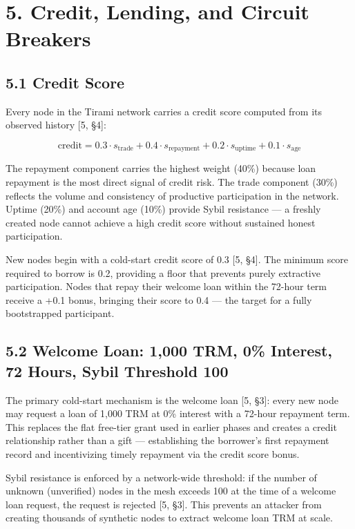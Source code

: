 \documentclass[
  11pt,
]{article}
\begin{document}
\section{5. Credit, Lending, and Circuit
Breakers}\label{credit-lending-and-circuit-breakers}

\subsection{5.1 Credit Score}\label{credit-score}

Every node in the Tirami network carries a credit score computed from
its observed history {[}5, §4{]}:

\[\text{credit} = 0.3 \cdot s_{\text{trade}} + 0.4 \cdot s_{\text{repayment}} + 0.2 \cdot s_{\text{uptime}} + 0.1 \cdot s_{\text{age}}\]

The repayment component carries the highest weight (40\%) because loan
repayment is the most direct signal of credit risk. The trade component
(30\%) reflects the volume and consistency of productive participation
in the network. Uptime (20\%) and account age (10\%) provide Sybil
resistance --- a freshly created node cannot achieve a high credit score
without sustained honest participation.

New nodes begin with a cold-start credit score of 0.3 {[}5, §4{]}. The
minimum score required to borrow is 0.2, providing a floor that prevents
purely extractive participation. Nodes that repay their welcome loan
within the 72-hour term receive a +0.1 bonus, bringing their score to
0.4 --- the target for a fully bootstrapped participant.

\subsection{5.2 Welcome Loan: 1,000 TRM, 0\% Interest, 72 Hours, Sybil
Threshold
100}\label{welcome-loan-1000-trm-0-interest-72-hours-sybil-threshold-100}

The primary cold-start mechanism is the welcome loan {[}5, §3{]}: every
new node may request a loan of 1,000 TRM at 0\% interest with a 72-hour
repayment term. This replaces the flat free-tier grant used in earlier
phases and creates a credit relationship rather than a gift ---
establishing the borrower's first repayment record and incentivizing
timely repayment via the credit score bonus.

Sybil resistance is enforced by a network-wide threshold: if the number
of unknown (unverified) nodes in the mesh exceeds 100 at the time of a
welcome loan request, the request is rejected {[}5, §3{]}. This prevents
an attacker from creating thousands of synthetic nodes to extract
welcome loan TRM at scale.
\end{document}

